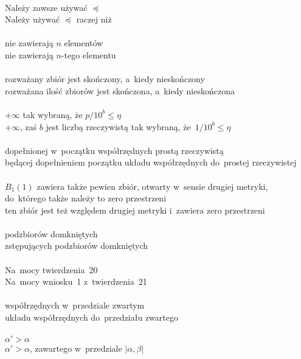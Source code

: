 \documentclass[a4paper,11pt]{article}
\numberwithin{equation}{section}
\begin{document}

\noindent
{} \\
\Jest  Należy zawsze używać $\preceq$ \\
\Powin Należy używać $\preceq$ raczej niż \\
 \\
\Jest  nie zawierają $n$ elementów \\
\Powin nie zawierają $n$-tego elementu \\
 \\
\Jest  rozważany zbiór jest skończony, a~kiedy nieskończony \\
\Powin rozważana ilość zbiorów jest skończona, a~kiedy nieskończona \\
 \\
\Jest  $+\infty$ tak wybraną, że $p / 10^{ b } \leq \eta$ \\
\Powin $+\infty$, zaś $b$ jest liczbą rzeczywistą tak wybraną,
że~$1 / 10^{ b } \leq \eta$ \\
 \\
\Jest dopełnionej w~początku współrzędnych prostą rzeczywistą \\
\Powin będącej dopełnieniem początku układu współrzędnych do~prostej
rzeczywistej \\
 \\
\Jest $B_{ 1 }( 1 )$ zawiera także pewien zbiór, otwarty w~sensie
drugiej
metryki, do~którego także należy to zero przestrzeni \\
\Powin ten zbiór jest też względem drugiej metryki i~zawiera zero
przestrzeni \\ %
 \\
\Jest podzbiorów domkniętych \\
\Powin  zstępujących podzbiorów domkniętych \\
 \\
\Jest Na~mocy twierdzenia~20 \\
\Powin Na~mocy wniosku~1 z~twierdzenia~21 \\
 \\
\Jest współrzędnych w~przedziale zwartym \\
\Powin  układu współrzędnych do~przedziału zwartego \\
 \\
\Jest $\alpha' > \alpha$ \\
\Powin  $\alpha' > \alpha$, zawartego w~przedziale $| \alpha, \beta |$ \\
\end{document}
